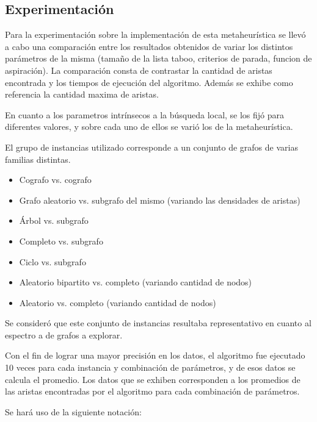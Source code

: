 \subsection{Experimentación}

Para la experimentación sobre la implementación de esta metaheurística se
llevó a cabo una comparación entre los resultados obtenidos de variar los
distintos parámetros de la misma (tamaño de la lista taboo, criterios de
parada, funcion de aspiración). La comparación consta de contrastar la
cantidad de aristas encontrada y los tiempos de ejecución del algoritmo.
Además se exhibe como referencia la cantidad maxima de aristas.

En cuanto a los parametros intrínsecos a la búsqueda local, se los
fijó para diferentes valores, y sobre cada uno de ellos se varió los de
la metaheurística.

El grupo de instancias utilizado corresponde a un conjunto de grafos de varias
familias distintas.

\begin{itemize}
\item Cografo vs. cografo
\item Grafo aleatorio vs. subgrafo del mismo (variando las densidades de
aristas)
\item Árbol vs. subgrafo
\item Completo vs. subgrafo
\item Ciclo vs. subgrafo
\item Aleatorio bipartito vs. completo (variando cantidad de nodos)
\item Aleatorio vs. completo (variando cantidad de nodos)
\end{itemize}

Se consideró que este conjunto de instancias resultaba representativo en
cuanto al espectro a de grafos a explorar.

Con el fin de lograr una mayor precisión en los datos, el algoritmo fue
ejecutado 10 veces para cada instancia y combinación de parámetros, y de esos
datos se calcula el promedio. Los datos que se exhiben corresponden a los
promedios de las aristas encontradas por el algoritmo para cada combinación de
parámetros.

Se hará uso de la siguiente notación:

